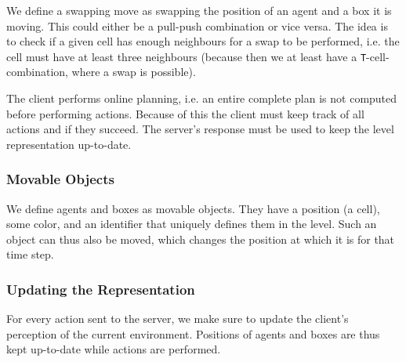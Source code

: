 We define a swapping move as swapping the position of an agent and a box it is moving.
This could either be a pull-push combination or vice versa.
The idea is to check if a given cell has enough neighbours for a swap to be performed, i.e. the cell must have at least three neighbours (because then we at least have a \texttt{T}-cell-combination, where a swap is possible).

The client performs online planning, i.e. an entire complete plan is not computed before performing actions.
Because of this the client must keep track of all actions and if they succeed.
The server's response must be used to keep the level representation up-to-date.

\subsubsection{Movable Objects}

We define agents and boxes as movable objects.
They have a position (a cell), some color, and an identifier that uniquely defines them in the level.
Such an object can thus also be moved, which changes the position at which it is for that time step.

\subsubsection{Updating the Representation}

For every action sent to the server, we make sure to update the client's perception of the current environment.
Positions of agents and boxes are thus kept up-to-date while actions are performed.

